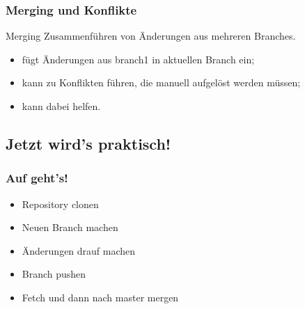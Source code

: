 \documentclass{cms-kurs}
\begin{document}
\begin{frame}
  \frametitle{Merging und Konflikte}

  \onslide<+->

  \begin{block}{Merging}
    Zusammenführen von Änderungen aus mehreren Branches.
  \end{block}

  \onslide<+->

  \begin{itemize}
  \item {} fügt Änderungen aus branch1 in aktuellen Branch
    ein;
  \item kann zu Konflikten führen, die manuell aufgelöst werden müssen;
  \item {} kann dabei helfen.
  \end{itemize}

\end{frame}

\subsection{Jetzt wird's praktisch!}

\begin{frame}
  \frametitle{Auf geht's!}

  \onslide<+->

  \begin{itemize}
  \item Repository clonen {\color{green}\Large\checkmark}
  \item Neuen Branch machen {\color{green}\Large\checkmark}
  \item Änderungen drauf machen
  \item Branch pushen
  \item Fetch und dann nach master mergen
  \end{itemize}
\end{frame}
\end{document}
